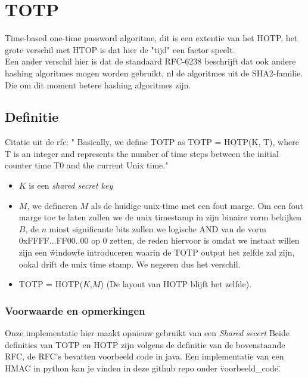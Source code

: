 \documentclass[10pt,a4paper]{report}
\begin{document}
\begin{section}
\section*{TOTP}
Time-based one-time password algoritme, dit is een extentie van het HOTP, het grote verschil met HTOP is dat hier de "tijd" een factor speelt.\\

Een ander verschil hier is dat de standaard RFC-6238 beschrijft dat ook andere hashing algoritmes mogen worden gebruikt, nl de algoritmes uit de SHA2-familie. Die om dit moment betere hashing algoritmes zijn.
\subsection*{Definitie}
Citatie uit de rfc: " 
Basically, we define TOTP as TOTP = HOTP(K, T), where T is an integer
and represents the number of time steps between the initial counter
time T0 and the current Unix time."
\begin{itemize}
\item $K$ is een \emph{shared secret key}
\item $M$, we defineren $M$ als de huidige unix-time met een fout marge. Om een fout marge toe te laten zullen we de unix timestamp in zijn binaire vorm bekijken $B$, de $n$ minst significante bits zullen we logische AND van de vorm 0xFFFF...FF00..00 op 0 zetten, de reden hiervoor is omdat we instaat willen zijn een \"window\" te introduceren waarin de TOTP output het zelfde zal zijn, ookal drift de unix time stamp. We negeren dus het verschil. 
\item TOTP = HOTP($K$,$M$) (De layout van HOTP blijft het zelfde).
\end{itemize}
\subsubsection*{Voorwaarde en opmerkingen}
Onze implementatie hier maakt opnieuw gebruikt van een \emph{Shared secert}
Beide definities van TOTP en HOTP zijn volgens de definitie van de bovenstaande RFC, de RFC's bevatten voorbeeld code in java. Een implementatie van een HMAC in python kan je vinden in deze github repo onder \"voorbeeld\_code\".
\end{section}
\end{document}
